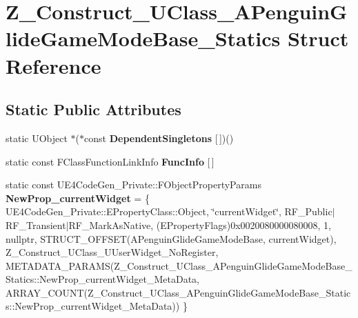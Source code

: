 \hypertarget{struct_z___construct___u_class___a_penguin_glide_game_mode_base___statics}{}\section{Z\+\_\+\+Construct\+\_\+\+U\+Class\+\_\+\+A\+Penguin\+Glide\+Game\+Mode\+Base\+\_\+\+Statics Struct Reference}
\label{struct_z___construct___u_class___a_penguin_glide_game_mode_base___statics}
\subsection*{Static Public Attributes}
\begin{DoxyCompactItemize}
\item 
\mbox{\label{struct_z___construct___u_class___a_penguin_glide_game_mode_base___statics_a67c83bfb5460bca1f4c81d5a1f7c5cf3}} 
static U\+Object $\ast$($\ast$const {\bfseries Dependent\+Singletons} \mbox{[}$\,$\mbox{]})()
\item 
static const F\+Class\+Function\+Link\+Info {\bfseries Func\+Info} \mbox{[}$\,$\mbox{]}
\item 
\mbox{\label{struct_z___construct___u_class___a_penguin_glide_game_mode_base___statics_af81c2aaf65a8ed014680a6ad7908d278}} 
static const U\+E4\+Code\+Gen\+\_\+\+Private\+::\+F\+Object\+Property\+Params {\bfseries New\+Prop\+\_\+current\+Widget} = \{ U\+E4\+Code\+Gen\+\_\+\+Private\+::\+E\+Property\+Class\+::\+Object, \char`\"{}current\+Widget\char`\"{}, R\+F\+\_\+\+Public$\vert$R\+F\+\_\+\+Transient$\vert$R\+F\+\_\+\+Mark\+As\+Native, (E\+Property\+Flags)0x0020080000080008, 1, nullptr, S\+T\+R\+U\+C\+T\+\_\+\+O\+F\+F\+S\+E\+T(\+A\+Penguin\+Glide\+Game\+Mode\+Base, current\+Widget), Z\+\_\+\+Construct\+\_\+\+U\+Class\+\_\+\+U\+User\+Widget\+\_\+\+No\+Register, M\+E\+T\+A\+D\+A\+T\+A\+\_\+\+P\+A\+R\+A\+M\+S(\+Z\+\_\+\+Construct\+\_\+\+U\+Class\+\_\+\+A\+Penguin\+Glide\+Game\+Mode\+Base\+\_\+\+Statics\+::\+New\+Prop\+\_\+current\+Widget\+\_\+\+Meta\+Data, A\+R\+R\+A\+Y\+\_\+\+C\+O\+U\+N\+T(\+Z\+\_\+\+Construct\+\_\+\+U\+Class\+\_\+\+A\+Penguin\+Glide\+Game\+Mode\+Base\+\_\+\+Statics\+::\+New\+Prop\+\_\+current\+Widget\+\_\+\+Meta\+Data)) \}
\item 

\end{DoxyCompactItemize}
